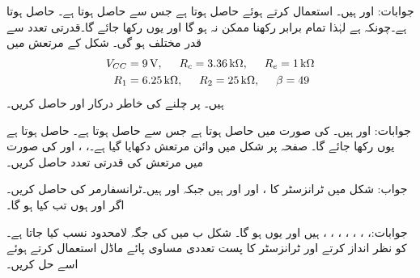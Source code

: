 جوابات: اور  ہیں۔ استعمال کرتے ہوئے حاصل ہوتا ہے جس سے  حاصل ہوتا ہے۔ حاصل ہوتا ہے۔چونکہ  ہے لہٰذا تمام  برابر رکھنا ممکن نہ ہو گا اور یوں  رکھا جائے گا۔قدرتی تعدد  سے قدر مختلف ہو گی۔
شکل  کے  مرتعش میں
\begin{align*}
V_{CC}&=\SI{9}{\volt}, \hspace{5mm} R_c=\SI{3.36}{\kilo \ohm}, \hspace{5mm} R_e=\SI{1}{\kilo \ohm}\\
R_1&=\SI{6.25}{\kilo \ohm}, \hspace{5mm} R_2=\SI{25}{\kilo \ohm}, \hspace{5mm} \beta=49
\end{align*}
ہیں۔ پر چلنے کی خاطر درکار  اور  حاصل کریں۔

جوابات: اور  ہیں۔ کی صورت میں  حاصل ہوتا ہے جس سے  حاصل ہوتا ہے۔ حاصل ہوتا ہے  یوں  رکھا جائے گا۔
صفحہ  پر شکل  میں وائن مرتعش دکھایا گیا ہے۔، ،  اور  کی صورت میں مرتعش کی قدرتی تعدد حاصل کریں۔

جواب:
شکل  میں ٹرانزسٹر کا ،  اور  اور  ہیں جبکہ  اور  ہیں۔ٹرانسفارمر کی  حاصل کریں۔اگر  اور  ہوں تب  کیا ہو گا۔

جوابات:، ، ، ، ، ، ،  ہیں اور یوں  ہو گا۔
شکل  ب میں  کی جگہ لامحدود  نسب کیا جاتا ہے۔ کو نظر انداز کرتے اور ٹرانزسٹر کا پست تعددی مساوی پائے ماڈل استعمال کرتے ہوئے اسے حل کریں۔

